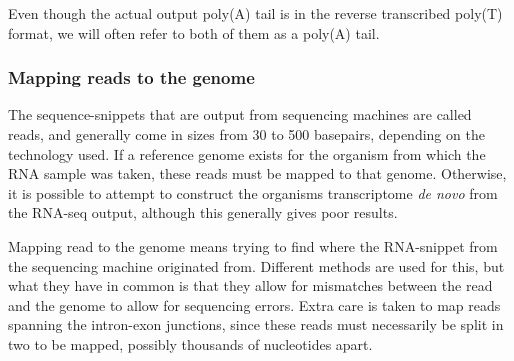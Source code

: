 Even though the actual output poly(A) tail is in the reverse transcribed
poly(T) format, we will often refer to both of them as a poly(A) tail.

\subsubsection{Mapping reads to the genome}
The sequence-snippets that are output from sequencing machines are called
reads, and generally come in sizes from 30 to 500 basepairs, depending on the
technology used. If a reference genome exists for the organism from which the
RNA sample was taken, these reads must be mapped to that genome. Otherwise, it
is possible to attempt to construct the organisms transcriptome \textit{de
novo} from the RNA-seq output, although this generally gives poor results.

Mapping read to the genome means trying to find where the RNA-snippet from the
sequencing machine originated from. Different methods are used for this, but
what they have in common is that they allow for mismatches between the read and
the genome to allow for sequencing errors. Extra care is taken to map reads
spanning the intron-exon junctions, since these reads must necessarily be split
in two to be mapped, possibly thousands of nucleotides apart.





